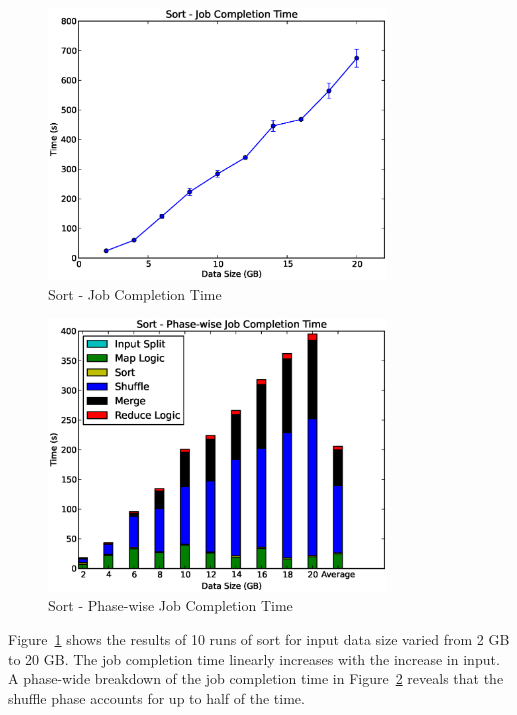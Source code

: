 \documentclass[a4paper,12pt,twoside,openright]{report}
\begin{document}
\begin{figure}[h!]
  \centering
    \includegraphics[width=0.8\textwidth]{sort.eps}
    \caption{Sort - Job Completion Time}
    \label{chap:eval:sec:ciel:fig:sort}
\end{figure}

\begin{figure}[h!]
  \centering
    \includegraphics[width=0.8\textwidth]{sort_phase.eps}
    \caption{Sort - Phase-wise Job Completion Time}
    \label{chap:eval:sec:ciel:fig:sortphase}
\end{figure}

Figure~\ref{chap:eval:sec:ciel:fig:sort} shows the results of 10 runs of sort
for input data size varied from 2 GB to 20 GB. The job completion time linearly
increases with the increase in input. A phase-wide breakdown of the job
completion time in Figure~\ref{chap:eval:sec:ciel:fig:sortphase} reveals that
the shuffle phase accounts for up to half of the time.
\end{document}
